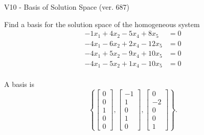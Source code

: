 \begin{exercise}
  \begin{exerciseTitle}V10 - Basis of Solution Space (ver. 687)\end{exerciseTitle}
  \begin{exerciseStatement}
    Find a basis for the solution space of the homogeneous system 
\begin{align*}
 -1 x_ 1 + 4 x_ 2 -5 x_ 4 + 8 x_ 5 &= 0  \\ 
  -4 x_ 1 -6 x_ 2 + 2 x_ 4 -12 x_ 5 &= 0  \\ 
  -4 x_ 1 + 5 x_ 2 -9 x_ 4 + 10 x_ 5 &= 0  \\ 
  -4 x_ 1 -5 x_ 2 + 1 x_ 4 -10 x_ 5 &= 0  \\ 
 \end{align*}


 
  \end{exerciseStatement}

  \begin{exerciseAnswer}
   A basis is   
\[\left\{\left[\begin{array}{c}
0 \\
0 \\
1 \\
0 \\
0
\end{array}\right] , \left[\begin{array}{c}
-1 \\
1 \\
0 \\
1 \\
0
\end{array}\right] , \left[\begin{array}{c}
0 \\
-2 \\
0 \\
0 \\
1
\end{array}\right]\right\}.\]

  


  \end{exerciseAnswer}
\end{exercise}